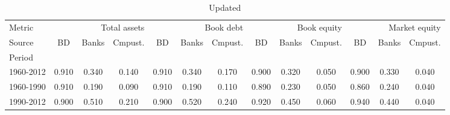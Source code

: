 
    \begin{table}[htbp]
      \centering
      \caption{Updated}
      \label{tab:Table 2}
      \small
      \begin{tabular}{lcccccccccccc}
\toprule
Metric & \multicolumn{3}{r}{Total assets} & \multicolumn{3}{r}{Book debt} & \multicolumn{3}{r}{Book equity} & \multicolumn{3}{r}{Market equity} \\
Source & BD & Banks & Cmpust. & BD & Banks & Cmpust. & BD & Banks & Cmpust. & BD & Banks & Cmpust. \\
Period &  &  &  &  &  &  &  &  &  &  &  &  \\
\midrule
1960-2012 & 0.910 & 0.340 & 0.140 & 0.910 & 0.340 & 0.170 & 0.900 & 0.320 & 0.050 & 0.900 & 0.330 & 0.040 \\
1960-1990 & 0.910 & 0.190 & 0.090 & 0.910 & 0.190 & 0.110 & 0.890 & 0.230 & 0.050 & 0.860 & 0.240 & 0.040 \\
1990-2012 & 0.900 & 0.510 & 0.210 & 0.900 & 0.520 & 0.240 & 0.920 & 0.450 & 0.060 & 0.940 & 0.440 & 0.040 \\
\bottomrule
\end{tabular}

    \end{table}
    